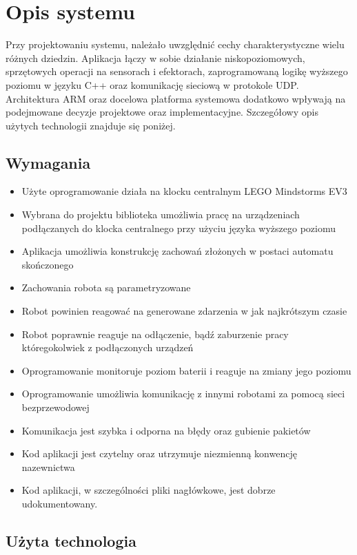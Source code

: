 \chapter{Opis systemu}
\label{ch:opis_systemu}

Przy projektowaniu systemu, należało uwzględnić cechy charakterystyczne wielu różnych dziedzin. Aplikacja łączy w sobie działanie niskopoziomowych, sprzętowych operacji na sensorach i efektorach, zaprogramowaną logikę wyższego poziomu w języku C++ oraz komunikację sieciową w protokole UDP. Architektura ARM oraz docelowa platforma systemowa dodatkowo wpływają na podejmowane decyzje projektowe oraz implementacyjne. Szczegółowy opis użytych technologii znajduje się poniżej.

\section{Wymagania}
\begin{itemize}
    \item Użyte oprogramowanie działa na klocku centralnym LEGO Mindstorms EV3
    \item Wybrana do projektu biblioteka umożliwia pracę na urządzeniach podłączanych do klocka centralnego przy użyciu języka wyższego poziomu
    \item Aplikacja umożliwia konstrukcję zachowań złożonych w postaci automatu skończonego
    \item Zachowania robota są parametryzowane
    \item Robot powinien reagować na generowane zdarzenia w jak najkrótszym czasie
    \item Robot poprawnie reaguje na odłączenie, bądź zaburzenie pracy któregokolwiek z podłączonych urządzeń
    \item Oprogramowanie monitoruje poziom baterii i reaguje na zmiany jego poziomu
    \item Oprogramowanie umożliwia komunikację z innymi robotami za pomocą sieci bezprzewodowej
    \item Komunikacja jest szybka i odporna na błędy oraz gubienie pakietów
    \item Kod aplikacji jest czytelny oraz utrzymuje niezmienną konwencję nazewnictwa
    \item Kod aplikacji, w szczególności pliki nagłówkowe, jest dobrze udokumentowany.
\end{itemize}

\section{Użyta technologia}

